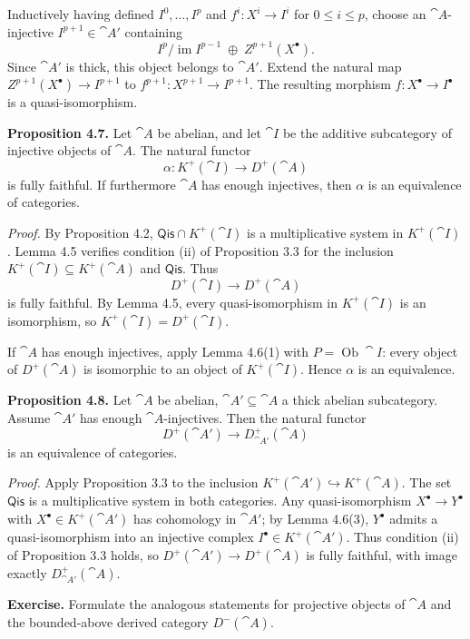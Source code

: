 Inductively having defined \(I^0,\dots,I^p\) and \(f^i\colon X^i\to I^i\) for \(0\le i\le p\), choose an \(\cat{A}\)-injective \(I^{p+1}\in\cat{A}'\) containing
\[
I^p\big/\operatorname{im}I^{p-1}\;\oplus\;Z^{p+1}(X^\bullet).
\]
Since \(\cat{A}'\) is thick, this object belongs to \(\cat{A}'\). Extend the natural map \(Z^{p+1}(X^\bullet)\to I^{p+1}\) to \(f^{p+1}\colon X^{p+1}\to I^{p+1}\). The resulting morphism \(f\colon X^\bullet\to I^\bullet\) is a quasi-isomorphism.

\setcounter{page}{46}
\textbf{Proposition 4.7.}
Let \(\cat{A}\) be abelian, and let \(\cat{I}\) be the additive subcategory of injective objects of \(\cat{A}\). The natural functor
\[
\alpha\colon K^+(\cat{I})\to D^+(\cat{A})
\]
is fully faithful. If furthermore \(\cat{A}\) has enough injectives, then \(\alpha\) is an equivalence of categories.

\textit{Proof.} By Proposition 4.2, \(\mathsf{Qis}\cap K^+(\cat{I})\) is a multiplicative system in \(K^+(\cat{I})\). Lemma 4.5 verifies condition (ii) of Proposition 3.3 for the inclusion \(K^+(\cat{I})\subseteq K^+(\cat{A})\) and \(\mathsf{Qis}\). Thus
\[
D^+(\cat{I})\to D^+(\cat{A})
\]
is fully faithful. By Lemma 4.5, every quasi-isomorphism in \(K^+(\cat{I})\) is an isomorphism, so \(K^+(\cat{I}) = D^+(\cat{I})\).

\setcounter{page}{47}
If \(\cat{A}\) has enough injectives, apply Lemma 4.6(1) with \(P=\operatorname{Ob}\cat{I}\): every object of \(D^+(\cat{A})\) is isomorphic to an object of \(K^+(\cat{I})\). Hence \(\alpha\) is an equivalence.

\medskip
\textbf{Proposition 4.8.}
Let \(\cat{A}\) be abelian, \(\cat{A}'\subseteq\cat{A}\) a thick abelian subcategory. Assume \(\cat{A}'\) has enough \(\cat{A}\)-injectives. Then the natural functor
\[
D^+(\cat{A}') \to D_{\cat{A}'}^+(\cat{A})
\]
is an equivalence of categories.

\textit{Proof.} Apply Proposition 3.3 to the inclusion \(K^+(\cat{A}')\hookrightarrow K^+(\cat{A})\). The set \(\mathsf{Qis}\) is a multiplicative system in both categories. Any quasi-isomorphism \(X^\bullet\to Y^\bullet\) with \(X^\bullet\in K^+(\cat{A}')\) has cohomology in \(\cat{A}'\); by Lemma 4.6(3), \(Y^\bullet\) admits a quasi-isomorphism into an injective complex \(I^\bullet\in K^+(\cat{A}')\). Thus condition (ii) of Proposition 3.3 holds, so \(D^+(\cat{A}')\to D^+(\cat{A})\) is fully faithful, with image exactly \(D_{\cat{A}'}^+(\cat{A})\).

\setcounter{page}{48}
\medskip
\textbf{Exercise.}
Formulate the analogous statements for projective objects of \(\cat{A}\) and the bounded-above derived category \(D^-(\cat{A})\).